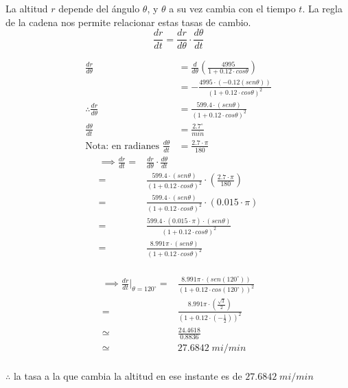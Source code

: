 La altitud $r$ depende del ángulo $\theta$, y $\theta$ a su vez cambia con el tiempo $t$. La regla de la cadena nos permite relacionar estas tasas de cambio.
$$\frac{dr}{dt}=\frac{dr}{d\theta}\cdot\frac{d\theta}{dt}$$
\begin{multicols}{2}
	\noindent
	\begin{align*}
		\frac{dr}{d\theta}                          & =\frac{d}{d\theta}\left(\frac{4995}{1+0.12\cdot cos\theta}\right)                                 \\
		                                            & =-\frac{4995\cdot\left(-0.12\left(sen \theta\right)\right)}{\left(1+0.12\cdot cos\theta\right)^2} \\
		\therefore \frac{dr}{d\theta}               & =\frac{599.4\cdot\left(sen \theta\right)}{\left(1+0.12\cdot cos\theta\right)^2}                   \\
		\frac{d\theta}{dt}                          & = \frac{2.7^\circ}{min}                                                                           \\
		\text{Nota: en radianes }\frac{d\theta}{dt} & = \frac{2.7\cdot\pi}{180}
	\end{align*}
	\columnbreak
	\begin{align*}
		\implies\frac{dr}{dt}= & \frac{dr}{d\theta}\cdot\frac{d\theta}{dt}                                                                               \\
		=                      & \frac{599.4\cdot\left(sen \theta\right)}{\left(1+0.12\cdot cos\theta\right)^2}\cdot\left(\frac{2.7\cdot\pi}{180}\right) \\
		=                      & \frac{599.4\cdot\left(sen \theta\right)}{\left(1+0.12\cdot cos\theta\right)^2}\cdot\left(0.015\cdot\pi\right)           \\
		=                      & \frac{599.4\cdot\left(0.015\cdot\pi\right)\cdot\left(sen \theta\right)}{\left(1+0.12\cdot cos\theta\right)^2}           \\
		=                      & \frac{8.991\pi\cdot\left(sen \theta\right)}{\left(1+0.12\cdot cos\theta\right)^2}                                       \\
	\end{align*}
\end{multicols}
\vspace{-30px}
\begin{align*}
	\implies\frac{dr}{dt}\bigg|_{\theta=120^\circ}= & \frac{8.991\pi\cdot\left(sen (120^\circ)\right)}{\left(1+0.12\cdot cos(120^\circ)\right)^2}    \\
	=                                               & \frac{8.991\pi\cdot\left(\frac{\sqrt{3}}{2}\right)}{\left(1+0.12\cdot (-\frac{1}{2})\right)^2} \\
	\simeq                                          & \frac{24.4618}{0.8836}                                                                         \\
	\simeq                                          & 27.6842\;mi/min                                                                                \\
\end{align*}

$\therefore$ la tasa a la que cambia la altitud en ese instante es de $27.6842\;mi/min$
